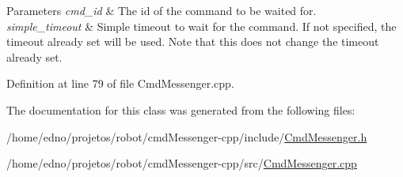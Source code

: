 \begin{DoxyParams}{Parameters}
{\em cmd\+\_\+id} & The id of the command to be waited for. \\
\hline
{\em simple\+\_\+timeout} & Simple timeout to wait for the command. If not specified, the timeout already set will be used. Note that this does not change the timeout already set. \\
\hline
\end{DoxyParams}


Definition at line 79 of file Cmd\+Messenger.\+cpp.



The documentation for this class was generated from the following files\+:\begin{DoxyCompactItemize}
\item 
/home/edno/projetos/robot/cmd\+Messenger-\/cpp/include/\hyperlink{_cmd_messenger_8h}{Cmd\+Messenger.\+h}\item 
/home/edno/projetos/robot/cmd\+Messenger-\/cpp/src/\hyperlink{_cmd_messenger_8cpp}{Cmd\+Messenger.\+cpp}\end{DoxyCompactItemize}
